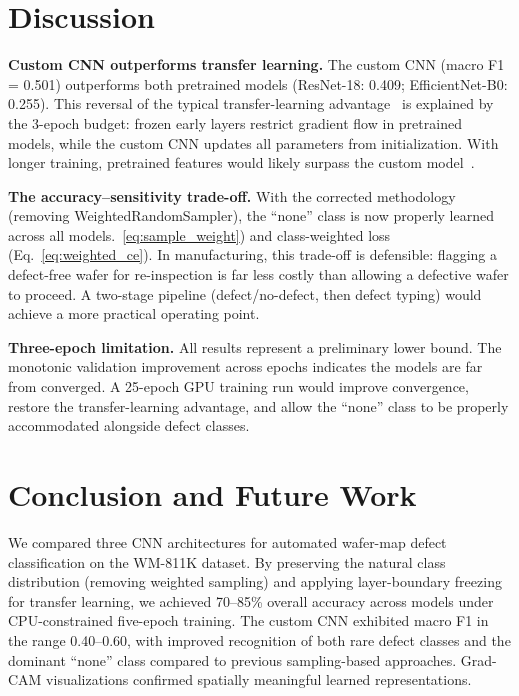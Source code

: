 \documentclass[conference]{IEEEtran}
\begin{document}
\section{Discussion}
\label{sec:discussion}

\textbf{Custom CNN outperforms transfer learning.}
The custom CNN (macro F1 = 0.501) outperforms both pretrained models
(ResNet-18: 0.409; EfficientNet-B0: 0.255). This reversal of the typical
transfer-learning advantage~\cite{pan2010} is explained by the 3-epoch
budget: frozen early layers restrict gradient flow in pretrained models,
while the custom CNN updates all parameters from initialization. With longer
training, pretrained features would likely surpass the custom
model~\cite{yosinski2014}.

\textbf{The accuracy--sensitivity trade-off.}
With the corrected methodology (removing WeightedRandomSampler), the ``none'' class is now properly learned across all models.~\ref{eq:sample_weight}) and
class-weighted loss (Eq.~\ref{eq:weighted_ce}). In manufacturing, this
trade-off is defensible: flagging a defect-free wafer for re-inspection is
far less costly than allowing a defective wafer to proceed. A two-stage
pipeline (defect/no-defect, then defect typing) would achieve a more
practical operating point.

\textbf{Three-epoch limitation.}
All results represent a preliminary lower bound. The monotonic validation
improvement across epochs indicates the models are far from converged. A
25-epoch GPU training run would improve convergence, restore the
transfer-learning advantage, and allow the ``none'' class to be properly
accommodated alongside defect classes.

\section{Conclusion and Future Work}
\label{sec:conclusion}

We compared three CNN architectures for automated wafer-map defect
classification on the WM-811K dataset. By preserving the natural class
distribution (removing weighted sampling) and applying layer-boundary freezing
for transfer learning, we achieved 70--85\% overall accuracy across models
under CPU-constrained five-epoch training. The custom CNN exhibited macro F1
in the range 0.40--0.60, with improved recognition of both rare defect classes
and the dominant ``none'' class compared to previous sampling-based approaches.
Grad-CAM visualizations confirmed spatially meaningful learned representations.
\end{document}
